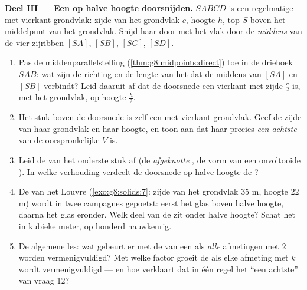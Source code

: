 \begin{problem}
\medskip
\noindent\textbf{Deel III --- Een  op halve hoogte doorsnijden.}
$SABCD$ is een regelmatige  met vierkant grondvlak: zijde van het
grondvlak $c$, hoogte $h$, top $S$ boven het middelpunt van het grondvlak. Snijd
haar door met het vlak door de \emph{middens} van de vier zijribben $[SA]$,
$[SB]$, $[SC]$, $[SD]$.
\begin{enumerate}[resume]
  \item Pas de middenparallelstelling (\cref{thm:g8:midpoints:direct}) toe in de
        driehoek $SAB$: wat zijn de richting en de lengte van het  dat de
        middens van $[SA]$ en $[SB]$ verbindt? Leid daaruit af dat de doorsnede
        een vierkant met zijde $\frac{c}{2}$ is,  met het grondvlak, op
        hoogte $\frac{h}{2}$.
  \item Het stuk boven de doorsnede is zelf een  met vierkant grondvlak.
        Geef de zijde van haar grondvlak en haar hoogte, en toon aan dat haar
         precies \emph{een achtste} van de oorspronkelijke  $V$ is.
  \item Leid de  van het onderste stuk af (de \emph{afgeknotte },
        de vorm van een onvoltooide ). In welke verhouding verdeelt de
        doorsnede op halve hoogte de ?
  \item De  van het Louvre (\cref{exo:g8:solids:7}: zijde van het
        grondvlak $35$ m, hoogte $22$ m) wordt in twee campagnes gepoetst: eerst
        het glas boven halve hoogte, daarna het glas eronder. Welk deel van de
        \emph{} zit onder halve hoogte? Schat het in kubieke meter, op
        honderd nauwkeurig.
  \item De algemene les: wat gebeurt er met de  van een  als
        \emph{alle} afmetingen met $2$ worden vermenigvuldigd? Met welke factor
        groeit de  als elke afmeting met $k$ wordt vermenigvuldigd --- en
        hoe verklaart dat in één regel het ``een achtste'' van vraag 12?
\end{enumerate}
\end{problem}
